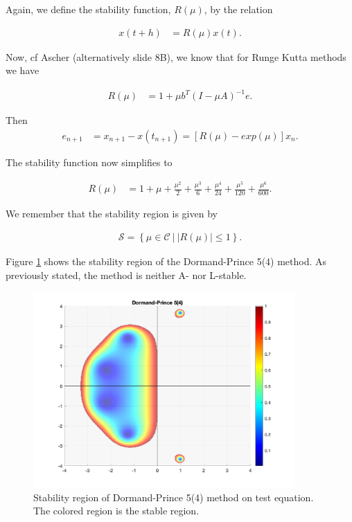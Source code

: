 Again, we define the stability function, $R(\mu)$, by the relation

\begin{align}
    x(t+h) &= R(\mu) x(t).
\end{align}

Now, cf Ascher\cite{Ascher} (alternatively slide 8B), we know that for Runge Kutta methods we have

\begin{align}
    R(\mu) &= 1 + \mu b^T (I-\mu A)^{-1} e.
\end{align}

Then
\begin{align}
    e_{n+1} &= x_{n+1} - x(t_{n+1}) = \left [ R(\mu) - exp(\mu) \right] x_n.
\end{align}

The stability function now simplifies to 

\begin{align}
    R(\mu) &= 1 + \mu + \frac{\mu^2}{2} + \frac{\mu^3}{6} + \frac{\mu^4}{24} + \frac{\mu^5}{120} + \frac{\mu^6}{600}.
\end{align}

We remember that the stability region is given by

\begin{align}
    \mathcal{S} = \left \{ \mu \in \mathcal{C} \ | \ |R(\mu)| \leq 1 \right \}.
\end{align}

Figure \ref{fig6:dopri_stability} shows the stability region of the Dormand-Prince 5(4) method. As previously stated, the method is neither A- nor L-stable. 

\begin{figure}[H]
    \centering
    \includegraphics[width=10cm]{graphics/opg6/dopri-stability.png}
    \caption{Stability region of Dormand-Prince 5(4) method on test equation. The colored region is the stable region.}
    \label{fig6:dopri_stability}
\end{figure}


